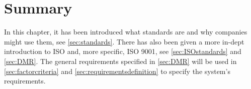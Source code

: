\section{Summary}
In this chapter, it has been introduced what standards are and why companies might use them, see \cref{sec:standards}.
There has also been given a more in-dept introduction to ISO and, more specific, ISO 9001, see \cref{sec:ISOstandards} and \cref{sec:DMR}.
The general requirements specified in \cref{sec:DMR} will be used in \cref{sec:factorcriteria} and \cref{sec:requirementsdefinition} to specify the system's requirements.
